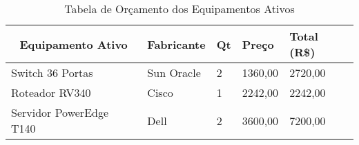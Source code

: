 \begin{table}[h!]
	\centering
	\begin{tabular}{|l|l|l|l|l|}
		\hline
		\multicolumn{1}{|c|}{\textbf{Equipamento Ativo}} & \multicolumn{1}{c|}{\textbf{Fabricante}} & \multicolumn{1}{c|}{\textbf{Qt}} & \textbf{Preço} & \textbf{Total (R\$)} \\ \hline
		Switch 36 Portas                                 & Sun Oracle                               & 2                                & 1360,00        & 2720,00              \\ \hline
		Roteador RV340                                   & Cisco                                    & 1                                & 2242,00        & 2242,00              \\ \hline
		Servidor PowerEdge T140                          & Dell                                     & 2                                & 3600,00        & 7200,00              \\ \hline
	\end{tabular}
\caption{Tabela de Orçamento dos Equipamentos Ativos}
\label{tab:orcAtivos}
\end{table}